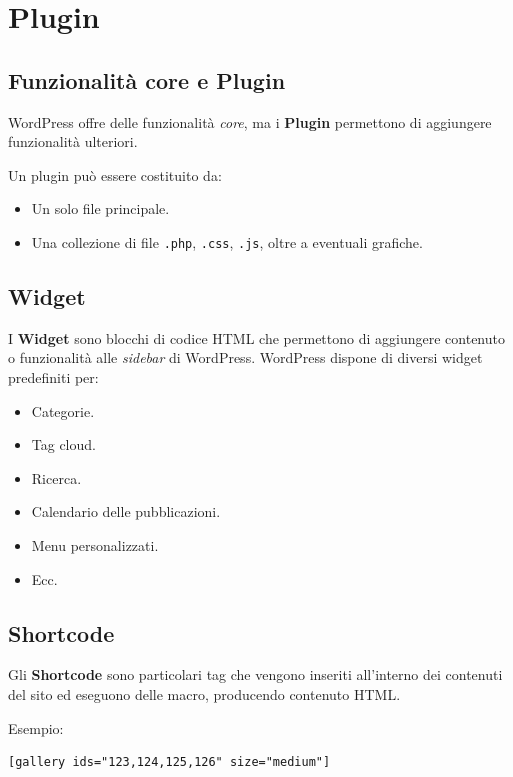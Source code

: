 \section{Plugin}

\subsection{Funzionalità core e Plugin}

WordPress offre delle funzionalità \emph{core}, ma i \textbf{Plugin} permettono di aggiungere funzionalità ulteriori.

Un plugin può essere costituito da:

\begin{itemize}
    \item Un solo file principale.
    \item Una collezione di file \texttt{.php}, \texttt{.css}, \texttt{.js}, oltre a eventuali grafiche.
\end{itemize}

\subsection{Widget}

I \textbf{Widget} sono blocchi di codice HTML che permettono di aggiungere contenuto o funzionalità alle \emph{sidebar} di WordPress. WordPress dispone di diversi widget predefiniti per:

\begin{itemize}
    \item Categorie.
    \item Tag cloud.
    \item Ricerca.
    \item Calendario delle pubblicazioni.
    \item Menu personalizzati.
    \item Ecc.
\end{itemize}

\subsection{Shortcode}

Gli \textbf{Shortcode} sono particolari tag che vengono inseriti all'interno dei contenuti del sito ed eseguono delle macro, producendo contenuto HTML.

Esempio:

\begin{verbatim}
[gallery ids="123,124,125,126" size="medium"]
\end{verbatim}

